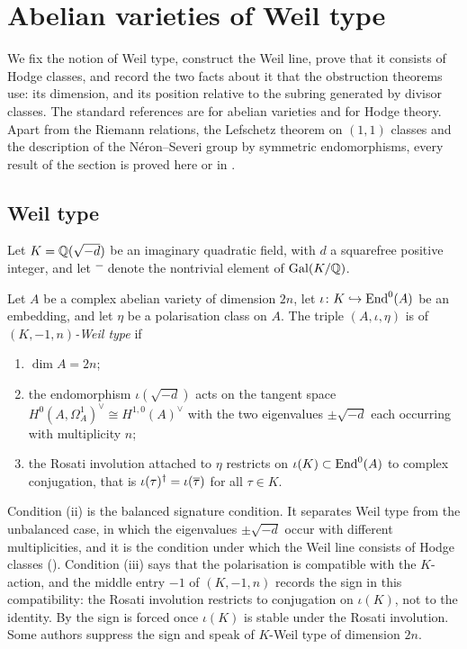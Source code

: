 \section{Abelian varieties of Weil type}\label{sec:weiltype}

We fix the notion of Weil type, construct the Weil line, prove that it
consists of Hodge classes, and record the two facts about it that the
obstruction theorems use: its dimension, and its position relative to the
subring generated by divisor classes. The standard references are \cite{BL04}
for abelian varieties and \cite{Voi02} for Hodge theory. Apart from the
Riemann relations, the Lefschetz theorem on $(1,1)$ classes and the
description of the N\'eron--Severi group by symmetric endomorphisms, every
result of the section is proved here or in .

\subsection{Weil type}

Let $K=\mathbb{Q}(\sqrt{-d})$ be an imaginary quadratic field, with $d$ a squarefree
positive integer, and let $\overline{\phantom{x}}$ denote the nontrivial element
of $\operatorname{Gal}(K/\mathbb{Q})$.

\begin{definition}\label{def:weiltype}
Let $A$ be a complex abelian variety of dimension $2n$, let
$\iota\colon K\hookrightarrow\operatorname{End}^{0}(A)$ be an embedding, and let $\eta$ be a
polarisation class on $A$. The triple $(A,\iota,\eta)$ is of
\emph{$(K,-1,n)$-Weil type} if
\begin{enumerate}[label=\textup{(\roman*)},nosep]
\item $\dim A=2n$;
\item the endomorphism $\iota(\sqrt{-d})$ acts on the tangent space
  $H^{0}(A,\Omega^{1}_{A})^{\vee}\cong H^{1,0}(A)^{\vee}$ with the two
  eigenvalues $\pm\sqrt{-d}$ each occurring with multiplicity $n$;
\item the Rosati involution attached to $\eta$ restricts on
  $\iota(K)\subset\operatorname{End}^{0}(A)$ to complex conjugation, that is
  $\iota(\tau)^{\dagger}=\iota(\overline{\tau})$ for all $\tau\in K$.
\end{enumerate}
\end{definition}

Condition (ii) is the balanced signature condition. It separates Weil type
from the unbalanced case, in which the eigenvalues $\pm\sqrt{-d}$ occur with
different multiplicities, and it is the condition under which the Weil line
consists of Hodge classes (). Condition (iii) says that
the polarisation is compatible with the $K$-action, and the middle entry $-1$
of $(K,-1,n)$ records the sign in this compatibility: the Rosati involution
restricts to conjugation on $\iota(K)$, not to the identity. By
 the sign is forced once $\iota(K)$ is stable under the
Rosati involution. Some authors suppress the sign and speak of $K$-Weil type
of dimension $2n$.

